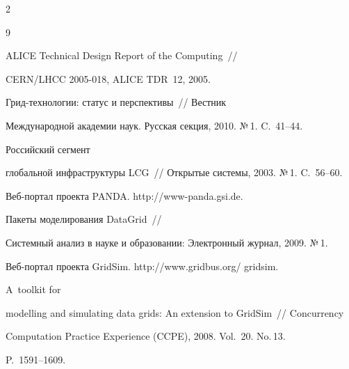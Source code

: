 \begin{multicols}{2}
{{


\begin{thebibliography}{9}


  




 ALICE Technical Design Report of the Computing~// 


CERN/LHCC 2005-018, ALICE TDR~12, 2005.




 Грид-тех\-но\-ло\-гии: статус и перспективы~// Вест\-ник 


Международной академии наук. Русская секция, 2010. №\,1. C.~41--44.







 Российский сегмент 


глобальной инфраструктуры LCG~// Открытые системы, 2003. №\,1. C.~56--60.







Веб-пор\-тал проекта PANDA. {\sf http://www-panda.gsi.de}.







 Пакеты моделирования DataGrid~// 


Сис\-тем\-ный анализ в науке и образовании: Электронный журнал, 2009. №\,1.




Веб-пор\-тал проекта GridSim. {\sf http://www.gridbus.org/ gridsim}.







 A~toolkit for 


modelling and simulating data grids: An extension to GridSim~// Concurrency  


Computation Practice Experience (CCPE), 2008. Vol.~20. No.\,13. 


P.~1591--1609.









\end{thebibliography}}}
\end{multicols}
